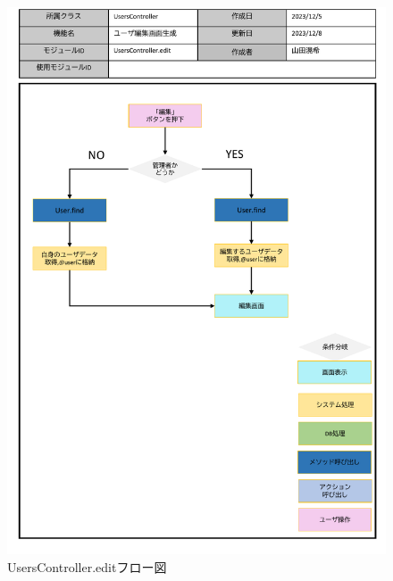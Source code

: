 \begin{figure}
    \centering
    \includegraphics[scale=0.6]{img/Users/pptx/UsersController_edit.pdf}
    \caption{UsersController.editフロー図}
\end{figure}

\clearpage



